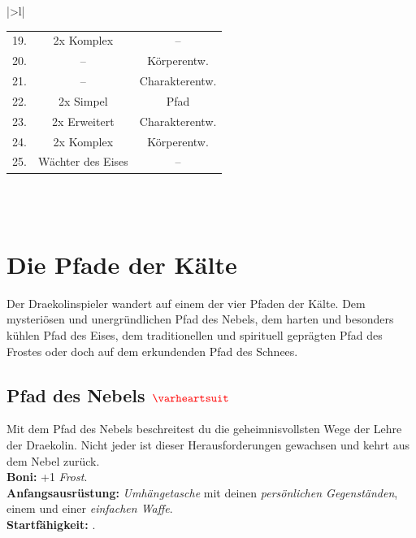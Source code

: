 \begin{table}[h!]
\begin{tabular}{|>{}l|}
\begin{tabular}{c|c|c}
            \rowcolor{myred} 19. & 2x Komplex & --\\
            \rowcolor{myblue} 20. & -- & Körperentw.\\
            \rowcolor{myred} 21. & -- & Charakterentw.\\
            \rowcolor{myblue} 22. & 2x Simpel & Pfad\\
            \rowcolor{myred} 23. & 2x Erweitert & Charakterentw.\\
            \rowcolor{myblue} 24. & 2x Komplex & Körperentw.\\
            \rowcolor{myred} 25. & Wächter des Eises & -- \\
        \end{tabular}\\
        \\
        \btrule{1pt}
    \end{tabular}
\end{table}

\section*{Die Pfade der Kälte}
Der Draekolinspieler wandert auf einem der vier Pfaden der Kälte. Dem mysteriösen und unergründlichen Pfad des Nebels, dem harten und besonders kühlen Pfad des Eises, dem traditionellen und spirituell geprägten Pfad des Frostes oder doch auf dem erkundenden Pfad des Schnees.


\subsection*{Pfad des Nebels $\Herz{}$}
Mit dem Pfad des Nebels beschreitest du die geheimnisvollsten Wege der Lehre der Draekolin. Nicht jeder ist dieser Herausforderungen gewachsen und kehrt aus dem Nebel zurück. \\
\textbf{Boni:} +1 \textit{ Frost}. \\
\textbf{Anfangsausrüstung:} \textit{Umhängetasche} mit deinen \textit{persönlichen Gegenständen}, einem \textit{} und einer \textit{einfachen Waffe}.\\
\textbf{Startfähigkeit:} . \\

